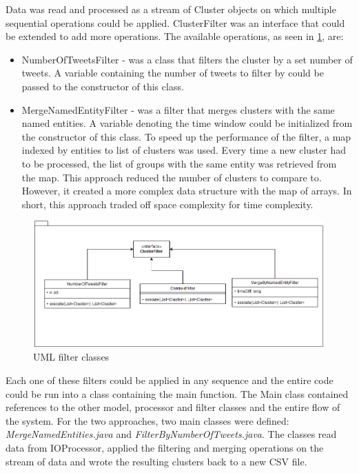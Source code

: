 \documentclass[a4paper,portrait,12pt]{article}
\begin{document}
Data was read and processed as a stream of Cluster objects on which multiple sequential operations could be applied.
ClusterFilter was an interface that could be extended to add more operations.
The available operations, as seen in \ref{fig:filterUML}, are:
\begin{itemize}
	\item NumberOfTweetsFilter - was a class that filters the cluster by a set number of tweets.
	      A variable containing the number of tweets to filter by could be passed to the constructor of this class.
	\item MergeNamedEntityFilter - was a filter that merges clusters with the same named entities.
		  A variable denoting the time window could be initialized from the constructor of this class.
		  To speed up the performance of the filter, a map indexed by entities to list of clusters was used.
		  Every time a new cluster had to be processed, the list of groups with the same entity was retrieved from the map. 
		  This approach reduced the number of clusters to compare to.
		  However, it created a more complex data structure with the map of arrays.
		  In short, this approach traded off space complexity for time complexity. 

\end{itemize}

\begin{figure}[h!]
	\centering
	\includegraphics[width=0.7\linewidth]{images/filterUML.png}
	\caption{UML filter classes}
	\label{fig:filterUML}
\end{figure}

Each one of these filters could be applied in any sequence and the entire code could be run into a class containing the main function.
The Main class contained references to the other model, processor and filter classes and the entire flow of the system.
For the two approaches, two main classes were defined: \textit{MergeNamedEntities.java} and \textit{FilterByNumberOfTweets.java}.
The classes read data from IOProcessor, applied the filtering and merging operations on the stream of data and wrote the resulting clusters back to a new CSV file.
\end{document}
